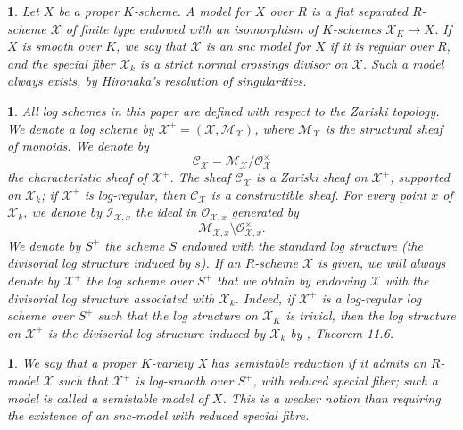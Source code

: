 \documentclass{amsart}%
\numberwithin{equation}{subsection}
\theoremstyle{plain2}
\theoremstyle{definition2}
\theoremstyle{stepstyle}
\theoremstyle{point}
\theoremstyle{subpoint}
\newtheorem{subpoint}[equation]{}%
\newcommand{\spa}[1]{\begin{subpoint}#1\end{subpoint}}           %
\newcommand{\cX}{\ensuremath{\mathscr{X}}}
\newcommand{\caM}{\ensuremath{\mathcal{M}}}
\newcommand{\caC}{\ensuremath{\mathcal{C}}}
\begin{document}
\spa{Let $X$ be a proper $K$-scheme. A model for $X$ over $R$ is a flat separated $R$-scheme $\cX$ of finite type endowed with an isomorphism of $K$-schemes $\cX_K \rightarrow X$. If $X$ is smooth over $K$,
we say that $\cX$ is an snc model for $X$ if it is regular over $R$, and the
special fiber $\cX_k$ is a strict normal crossings divisor on $\cX$. Such a model always exists, by Hironaka's resolution of singularities.}

\spa{ \label{sss-log} All log schemes in this paper are defined with respect to the Zariski topology. We denote a log scheme by $\cX^+=(\cX,\caM_{\cX})$, where $\caM_{\cX}$ is the structural sheaf of monoids. We denote by $$\mathcal{C}_{\cX}=\mathcal{M}_{\cX}/\mathcal{O}_{\cX}^{\times}$$
the characteristic sheaf of $\cX^+$. The sheaf $\mathcal{C}_{\cX}$
is a Zariski sheaf on $\cX^+$, supported on $\cX_k$; if $\cX^+$ is log-regular, then $\caC_{\cX}$ is a constructible sheaf.
For every point $x$ of $\cX_k$, we denote by $\mathcal{I}_{\cX,x}$
the ideal in $\mathcal{O}_{\cX,x}$ generated by
$$\mathcal{M}_{\cX,x}\setminus \mathcal{O}_{\cX,x}^{\times}.$$ We denote
by $S^+$ the scheme $S$ endowed with the standard log structure
(the divisorial log structure induced by $s$). If an $R$-scheme $\cX$ is given, we will always denote by $\cX^+$ the log scheme over $S^+$ that we obtain by endowing $\cX$ with the divisorial log structure associated with
$\cX_k$. Indeed, if $\cX^+$ is a log-regular log scheme over $S^+$ such that the log structure on $\cX_K$ is trivial, then the log structure on $\cX^+$ is the divisorial log structure induced by $\cX_k$ by \cite{Kato1994a}, Theorem 11.6.

}

\spa{We say that a proper $K$-variety X has semistable reduction if it admits an $R$-model $\cX$ such that $\cX^+$ is log-smooth over $S^+$, with reduced special fiber; such a model is called a semistable model of $X$. This is a weaker notion than requiring the existence of an snc-model with reduced special fibre.}
\end{document}
